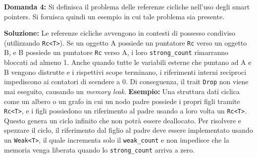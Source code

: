 \begin{exambox}
\textbf{Domanda 4:} Si definisca il problema delle referenze cicliche nell’uso degli smart pointers. Si fornisca quindi un esempio in cui tale problema sia presente.
\end{exambox}
\textbf{Soluzione:}
Le referenze cicliche avvengono in contesti di possesso condiviso (utilizzando \texttt{Rc<T>}). Se un oggetto A possiede un puntatore \texttt{Rc} verso un oggetto B, e B possiede un puntatore \texttt{Rc} verso A, i loro \texttt{strong\_count} rimarranno bloccati ad almeno 1. Anche quando tutte le variabili esterne che puntano ad A e B vengono distrutte e i rispettivi scope terminano, i riferimenti interni reciproci impediscono ai contatori di scendere a 0. Di conseguenza, il trait \texttt{Drop} non viene mai eseguito, causando un \textit{memory leak}.
\textbf{Esempio:}
Una struttura dati ciclica come un albero o un grafo in cui un nodo padre possiede i propri figli tramite \texttt{Rc<T>}, e i figli possiedono un riferimento al padre usando a loro volta un \texttt{Rc<T>}. Questo genera un ciclo infinito che non potrà essere deallocato. Per risolvere e spezzare il ciclo, il riferimento dal figlio al padre deve essere implementato usando un \texttt{Weak<T>}, il quale incrementa solo il \texttt{weak\_count} e non impedisce che la memoria venga liberata quando lo \texttt{strong\_count} arriva a zero.
